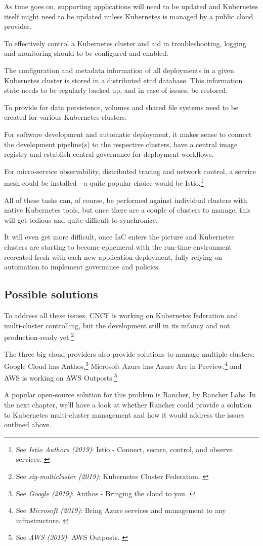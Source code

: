 As time goes on, supporting applications will need to be updated and Kubernetes itself might need to be updated unless Kubernetes is managed by a public cloud provider.

To effectively control a Kubernetes cluster and aid in troubleshooting, logging and monitoring should to be configured and enabled.

The configuration and metadata information of all deployments in a given Kubernetes cluster is stored in a distributed etcd database. This information state needs to be regularly backed up, and in case of issues, be restored.

To provide for data persistence, volumes and shared file systems need to be created for various Kubernetes clusters.

For software development and automatic deployment, it makes sense to connect the development pipeline(s) to the respective clusters, have a central image registry and establish central governance for deployment workflows.

For micro-service observability, distributed tracing and network control, a service mesh could be installed - a quite popular choice would be Istio.\footnote{See \textit{Istio Authors (2019)}: Istio - Connect, secure, control, and observe services. \cite{istio}}

All of these tasks can, of course, be performed against individual clusters with native Kubernetes tools, but once there are a couple of clusters to manage, this will get tedious and quite difficult to synchronize.

It will even get more difficult, once IaC enters the picture and Kubernetes clusters are starting to become ephemeral with the run-time environment recreated fresh with each new application deployment, fully relying on automation to implement governance and policies.

\subsection{Possible solutions}

To address all these issues, CNCF is working on Kubernetes federation and multi-cluster controlling, but the development still in its infancy and not production-ready yet.\footnote{See \textit{sig-multicluster (2019)}: Kubernetes Cluster Federation. \cite{kubeFed}}

The three big cloud providers also provide solutions to manage multiple clusters: Google Cloud has Anthos,\footnote{See \textit{Google (2019)}: Anthos - Bringing the cloud to you. \cite{googleAnthos}} Microsoft Azure has Azure Arc in Preview,\footnote{See \textit{Microsoft (2019)}: Bring Azure services and management to any infrastructure. \cite{azureArc}} and AWS is working on AWS Outposts.\footnote{See \textit{AWS (2019)}: AWS Outposts. \cite{awsOutposts}}

A popular open-source solution for this problem is Rancher, by Rancher Labs. In the next chapter, we'll have a look at whether Rancher could provide a solution to Kubernetes multi-cluster management and how it would address the issues outlined above.

